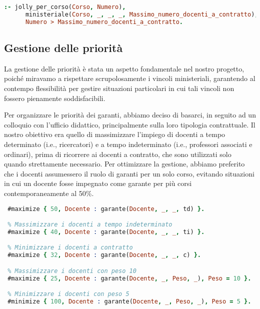 \begin{lstlisting}[language=prolog, caption={Vincolo sul numero massimo di docenti a contratto.}]
 :- jolly_per_corso(Corso, Numero),
      ministeriale(Corso, _, _, _, Massimo_numero_docenti_a_contratto),
      Numero > Massimo_numero_docenti_a_contratto.
\end{lstlisting}





\subsection{Gestione delle priorità}\label{sec:priorita}
La gestione delle priorità è stata un aspetto fondamentale nel nostro progetto, poiché 
miravamo a rispettare scrupolosamente i vincoli ministeriali, garantendo al contempo 
flessibilità per gestire situazioni particolari in cui tali vincoli non fossero 
pienamente soddisfacibili.

Per organizzare le priorità dei garanti, abbiamo deciso di basarci, in seguito ad un 
colloquio con l'ufficio didattico, principalmente sulla loro tipologia contrattuale. 
Il nostro obiettivo era quello di massimizzare l'impiego di docenti a tempo determinato 
(i.e., ricercatori) e a tempo indeterminato (i.e., professori associati e ordinari), prima 
di ricorrere ai docenti a contratto, che sono utilizzati solo quando strettamente necessario. 
Per ottimizzare la gestione, abbiamo preferito che i docenti assumessero il ruolo di 
garanti per un solo corso, evitando situazioni in cui un docente fosse impegnato come 
garante per più corsi contemporaneamente al 50\%.

\begin{lstlisting}[language=prolog, caption=Gestione delle priorità dei docenti.]
 % Massimizzare i docenti a tempo determinato (ricercatori)
 #maximize { 50, Docente : garante(Docente, _, _, td) }.

 % Massimizzare i docenti a tempo indeterminato
 #maximize { 40, Docente : garante(Docente, _, _, ti) }.

 % Minimizzare i docenti a contratto
 #maximize { 32, Docente : garante(Docente, _, _, c) }.

 % Massimizzare i docenti con peso 10
 #maximize { 25, Docente : garante(Docente, _, Peso, _), Peso = 10 }.

 % Minimizzare i docenti con peso 5
 #minimize { 100, Docente : garante(Docente, _, Peso, _), Peso = 5 }.
\end{lstlisting}

